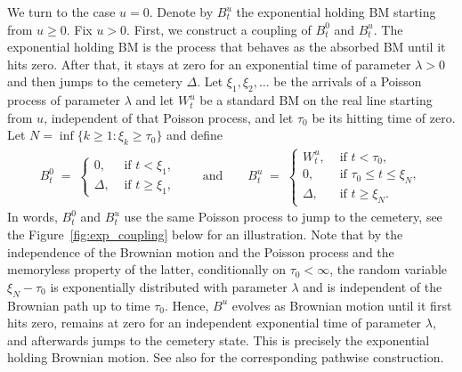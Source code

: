 \documentclass[12pt,a4paper]{article}
\theoremstyle{plain}
\theoremstyle{remark}
\begin{document}
	We turn to the case $u=0$.
	Denote by $B^u_t$ the exponential holding BM  starting from $u\geq 0$. Fix $u>0$. First, we construct a  coupling of $B^0_t$ and $B^u_t$. The exponential holding BM is the process that behaves as the absorbed BM until it hits zero. After that, it stays at zero for an exponential time of parameter $\lambda>0$ and then jumps to the cemetery $\Delta$. Let $\xi_1, \xi_2,\ldots$ be the arrivals of a Poisson  process of parameter $\lambda$ and let $W_t^u$ be a standard BM on the real line starting from $u$, independent of that Poisson process, and let $\tau_0$ be its hitting time of zero. Let $N = \inf\{k\geq 1: \xi_k \geq \tau_0\}$ and define
	\begin{align*}
		B^0_t \;=\; \begin{cases}
			0, & \text{ if } t< \xi_1,\\
			\Delta, & \text{ if } t\geq \xi_1,
		\end{cases}
		\qquad 	\text{and} \qquad
		B^u_t \;=\; \begin{cases}
			W_t^u, & \text{ if } t< \tau_0,\\
			0, & \text{ if } \tau_0 \leq t\leq \xi_N,\\
			\Delta, & \text{ if }  t\geq  \xi_N.
		\end{cases}   
	\end{align*} 
	In words, $B^0_t$ and $B^u_t$ use the same Poisson process to jump to the cemetery, see the Figure~\ref{fig:exp_coupling} below for an illustration.
	Note that by the independence of the Brownian motion and the Poisson process and the memoryless property of the latter, conditionally on $\tau_0<\infty$, the random variable $\xi_N-\tau_0$ is exponentially distributed with parameter $\lambda$ and is independent of the Brownian path up to time $\tau_0$. Hence, $B^u$ evolves as Brownian motion until it first hits zero, remains at zero for an independent exponential time of parameter $\lambda$, and afterwards jumps to the cemetery state. This is precisely the exponential holding Brownian motion. See also \cite[Sections 3 and 5]{Kostrykin} for the corresponding pathwise construction.
	
\end{document}
